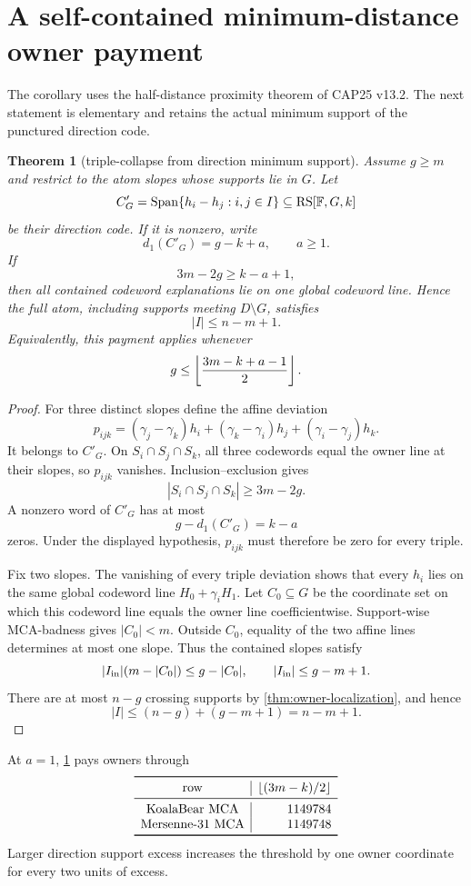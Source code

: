 \documentclass[11pt,a4paper]{amsart}
\numberwithin{equation}{section}
\newtheorem{theorem}{Theorem}[section]
\theoremstyle{remark}
\DeclareMathOperator{\RS}{RS}\DeclareMathOperator{\MCA}{MCA}\DeclareMathOperator{\CA}{CA}
\newcommand{\F}{\mathbb F}\newcommand{\B}{\mathbb B}\newcommand{\K}{\mathbb K}\newcommand{\Z}{\mathbb Z}
\begin{document}
\section{A self-contained minimum-distance owner payment}

The corollary uses the half-distance proximity theorem of CAP25 v13.2.  The next statement is elementary and retains the actual minimum support of the punctured direction code.

\begin{theorem}[triple-collapse from direction minimum support]\label{thm:triple-collapse}
Assume $g\ge m$ and restrict to the atom slopes whose supports lie in $G$.  Let
\[
 C'_G=\Span\{h_i-h_j:i,j\in I\}\subseteq\RS[\F,G,k]
\]
be their direction code.  If it is nonzero, write
\[
 d_1(C'_G)=g-k+a,
 \qquad a\ge1.
\]
If
\[
 \boxed{
 3m-2g\ge k-a+1,
 }
\]
then all contained codeword explanations lie on one global codeword line.  Hence the full atom, including supports meeting $D\setminus G$, satisfies
\[
 \boxed{|I|\le n-m+1.}
\]
Equivalently, this payment applies whenever
\[
 g\le\left\lfloor \frac{3m-k+a-1}{2}\right\rfloor.
\]
\end{theorem}

\begin{proof}
For three distinct slopes define the affine deviation
\[
 p_{ijk}
 =(
 \gamma_j-\gamma_k)h_i
 +(\gamma_k-\gamma_i)h_j
 +(\gamma_i-\gamma_j)h_k.
\]
It belongs to $C'_G$.  On $S_i\cap S_j\cap S_k$, all three codewords equal the owner line at their slopes, so $p_{ijk}$ vanishes.  Inclusion--exclusion gives
\[
 |S_i\cap S_j\cap S_k|\ge3m-2g.
\]
A nonzero word of $C'_G$ has at most
\[
 g-d_1(C'_G)=k-a
\]
zeros.  Under the displayed hypothesis, $p_{ijk}$ must therefore be zero for every triple.

Fix two slopes.  The vanishing of every triple deviation shows that every $h_i$ lies on the same global codeword line $H_0+\gamma_iH_1$.  Let $C_0\subseteq G$ be the coordinate set on which this codeword line equals the owner line coefficientwise.  Support-wise MCA-badness gives $|C_0|<m$.  Outside $C_0$, equality of the two affine lines determines at most one slope.  Thus the contained slopes satisfy
\[
 |I_{\rm in}|(m-|C_0|)\le g-|C_0|,
 \qquad
 |I_{\rm in}|\le g-m+1.
\]
There are at most $n-g$ crossing supports by \cref{thm:owner-localization}, and hence
\[
 |I|\le(n-g)+(g-m+1)=n-m+1.
\]
\end{proof}

\begin{corollary}\label{cor:triple-active}
At $a=1$, \cref{thm:triple-collapse} pays owners through
\[
\begin{array}{c|r}
\toprule
\text{row}&\floor{(3m-k)/2}\\
\midrule
\text{KoalaBear MCA}&1149784\\
\text{Mersenne-31 MCA}&1149748\\
\bottomrule
\end{array}
\]
Larger direction support excess increases the threshold by one owner coordinate for every two units of excess.
\end{corollary}
\end{document}
